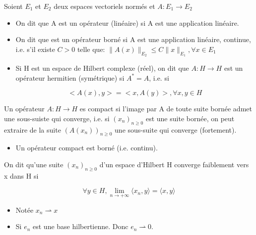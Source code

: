 \documentclass[10pt,a4paper,oneside]{article}
\newenvironment{definition}[1][Definition]{\begin{trivlist}
\item[\hskip \labelsep {\bfseries #1}]}{\end{trivlist}}
\begin{document}
\begin{definition}

\item
Soient $E_1$ et $E_2$ deux espaces vectoriels normés et $A: E_1 \rightarrow E_2$

\begin{itemize}

\item
On dit que A est un opérateur (linéaire) si A est une application linéaire.

\item

On dit que est un opérateur borné si A est une application linéaire, continue, i.e. s'il existe $C > 0$ telle que: $\|A(x)\|_{E_2} \leq C \|x\|_{E_1}, \forall x \in E_1$

\item
Si H est un espace de Hilbert complexe (réel), on dit que $A: H \rightarrow H$ est un opérateur hermitien (symétrique) si $A^* = A$, i.e. si

\[ <A(x),y> = <x,A(y)>, \forall x,y \in H \]

\end{itemize}

\end{definition}


\begin{definition}
Un opérateur $A: H \rightarrow H$ es compact si l'image par A de toute suite bornée admet une sous-suiste qui converge, i.e. si $(x_n)_{n\geq0}$ est une suite bornée, on peut extraire de la suite $(A(x_n))_{n\geq0}$ une sous-suite qui converge (fortement).

\begin{itemize}
\item
Un opérateur compact est borné (i.e. continu).
\end{itemize}

\end{definition}


\begin{definition}
On dit qu'une suite $(x_n)_{n\geq0}$ d'un espace d'Hilbert H converge faiblement vers x dans H si

\[ \forall y \in H, \lim\limits_{n\rightarrow+\infty}\langle x_n,y \rangle = \langle x,y \rangle \]

\begin{itemize}

\item
Notée $x_n \rightharpoonup x$

\item
Si $e_n$ est une base hilbertienne. Donc $e_n \rightharpoonup 0$.

\end{itemize}

\end{definition}
\end{document}

